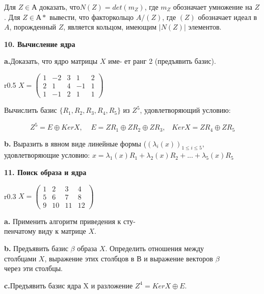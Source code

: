 Для $Z \in А$ доказать, $что N(Z) = det(m_Z)$, где $m_Z$ обозначает 
умножение на $Z$. Для $Z \in А*$ вывести, что факторкольцо $A/(Z)$, где $(Z)$ 
обозначает идеал в $A$, порожденный $Z$, является кольцом, имеющим $|N(Z)|$ 
элементов. 

\medskip

{\noindent\bf 10. Вычисление ядра}



{\bf a.}Доказать, что ядро матрицы $X$ име-
ет ранг 2 (предъявить базис).
\begin{wrapfigure}{r}{0.5\textwidth}
$X=\begin{pmatrix}
1 & -2 & 3 & 1 & 2\\
2 & 1 & 4 & -1 & 1\\
1 & -1 & 2 & 1 & 1
\end{pmatrix}$  
\end{wrapfigure}

Вычислить базис $\{R_1, R_2, R_3, R_4, R_5\}$ из $\mathit{Z}^5$, удовлетворяющий условию:

$$ \mathit{Z}^5=E\oplus KerX,\;\;\;\;E =\mathit{Z}R_1\oplus\mathit{Z}R_2\oplus\mathit{Z}R_3,\;\;\; Ker X= \mathit{Z}R_4\oplus\mathit{Z}R_5 $$
 
{\bf b.} Выразить в явном виде линейные формы ($(\lambda_i(x))_{1\leqslant i\leqslant 5},$ 
удовлетворяющие условию: $ x = \lambda_1(x)R_1+\lambda_2(x)R_2+...+\lambda_5(x)R_5 $


\pagebreak

{\noindent\bf11. Поиск образа и ядра}
\begin{wrapfigure}{r}{0.3\textwidth}
$X=\begin{pmatrix}
1 & 2 & 3 & 4 \\
5 & 6 & 7 & 8\\
9 & 10 & 11 & 12
\end{pmatrix}$  
\end{wrapfigure}

{\bf a.} Применить алгоритм приведения к сту-\\пенчатому виду к матрице $X$.
 
\bigskip

{\bf b.} Предъявить базис $ \beta $ образа $X$. Определить отношения между\\
столбцами $X$, выражение этих столбцов в В и выражение векторов $ \beta $\\ 
через эти столбцы. 

\medskip

{\bf c.}Предъявить базис ядра X и разложение $Z^4=Ker X \oplus E$. 


